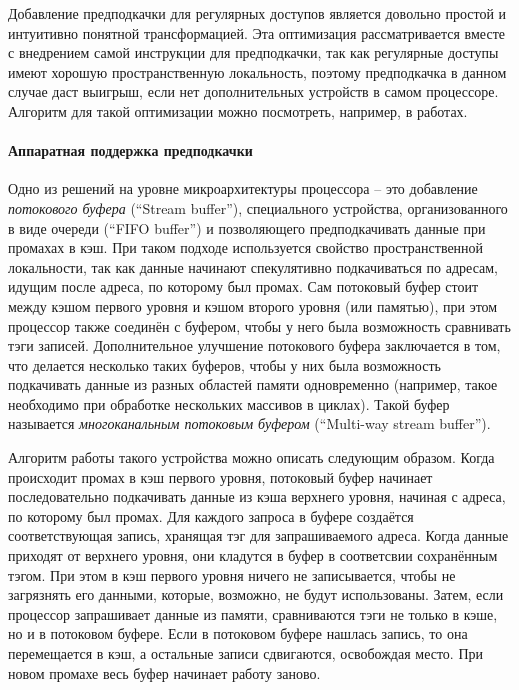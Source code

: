 \documentclass[12pt,a4paper,oneside]{article}
\begin{document}
Добавление предподкачки для регулярных доступов является довольно простой и интуитивно понятной трансформацией. Эта оптимизация рассматривается вместе с внедрением самой инструкции для предподкачки\cite{CallahanPref}, так как регулярные доступы имеют хорошую пространственную локальность, поэтому предподкачка в данном случае даст выигрыш, если нет дополнительных устройств в самом процессоре. Алгоритм для такой оптимизации можно посмотреть, например, в работах\cite{MowryStride}\cite{CallahanPref}.

\paragraph{Аппаратная поддержка предподкачки}

Одно из решений на уровне микроархитектуры процессора -- это добавление \emph{потокового буфера} (``Stream buffer'')\cite{Jouppi:1990}, специального устройства, организованного в виде очереди (``FIFO buffer'') и позволяющего предподкачивать данные при промахах в кэш. При таком подходе используется свойство пространственной локальности, так как данные начинают спекулятивно подкачиваться по адресам, идущим после адреса, по которому был промах. Сам потоковый буфер стоит между кэшом первого уровня и кэшом второго уровня (или памятью), при этом процессор также соединён с буфером, чтобы у него была возможность сравнивать тэги записей. Дополнительное улучшение потокового буфера заключается в том, что делается несколько таких буферов, чтобы у них была возможность подкачивать данные из разных областей памяти одновременно (например, такое необходимо при обработке нескольких массивов в циклах). Такой буфер называется \emph{многоканальным потоковым буфером} (``Multi-way stream buffer'').

Алгоритм работы такого устройства можно описать следующим образом. Когда происходит промах в кэш первого уровня, потоковый буфер начинает последовательно подкачивать данные из кэша верхнего уровня, начиная с адреса, по которому был промах. Для каждого запроса в буфере создаётся соответствующая запись, хранящая тэг для запрашиваемого адреса. Когда данные приходят от верхнего уровня, они кладутся в буфер в соответсвии сохранённым тэгом. При этом в кэш первого уровня ничего не записывается, чтобы не загрязнять его данными, которые, возможно, не будут использованы. Затем, если процессор запрашивает данные из памяти, сравниваются тэги не только в кэше, но и в потоковом буфере. Если в потоковом буфере нашлась запись, то она перемещается в кэш, а остальные записи сдвигаются, освобождая место. При новом промахе весь буфер начинает работу заново.
\end{document}
